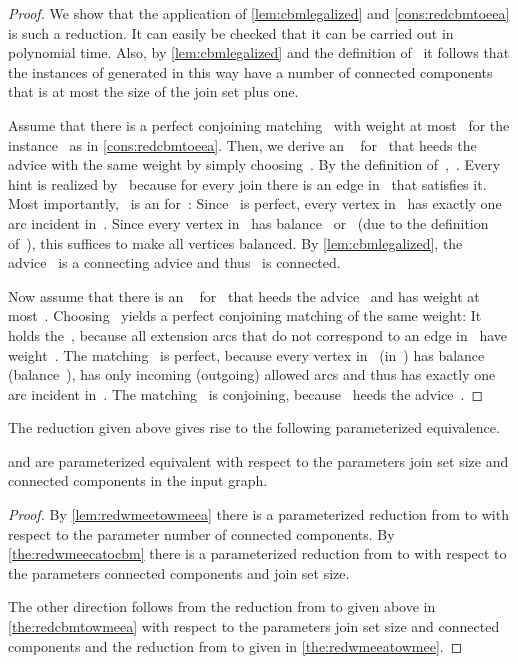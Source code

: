 \begin{proof}
  We show that the application of \autoref{lem:cbmlegalized} and \autoref{cons:redcbmtoeea} is such a reduction. It can easily be checked that it can be carried out in polynomial time. Also, by \autoref{lem:cbmlegalized} and the definition of~ it follows that the instances of \pWMEEAs{} generated in this way have a number of connected components that is at most the size of the join set plus one.

  Assume that there is a perfect conjoining matching~ with weight at most~ for the instance~ as in \autoref{cons:redcbmtoeea}. Then, we derive an \EE{}~ for~ that heeds the advice with the same weight by simply choosing~. By the definition of~,~. Every hint is realized by~ because for every join there is an edge in~ that satisfies it. Most importantly,~ is an \EE{} for~: Since~ is perfect, every vertex in~ has exactly one arc incident in~. Since every vertex in~ has balance~ or~ (due to the definition of~), this suffices to make all vertices balanced. By \autoref{lem:cbmlegalized}, the advice~ is a connecting advice and thus~ is connected.

  Now assume that there is an \EE{}~ for~ that heeds the advice~ and has weight at most~. Choosing~ yields a perfect conjoining matching of the same weight: It holds the~, because all extension arcs that do not correspond to an edge in~ have weight~. The matching~ is perfect, because every vertex in~ (in~) has balance~ (balance~), has only incoming (outgoing) allowed arcs and thus has exactly one arc incident in~. The matching~ is conjoining, because~ heeds the advice~.
\end{proof}
The reduction given above gives rise to the following parameterized equivalence.
\begin{theorem}\label{the:cbmwmeeequiv}
  \pCBM{} and \pWMEE{} are parameterized equivalent with respect to the parameters join set size and connected components in the input graph. 
\end{theorem}
\begin{proof}
  By \autoref{lem:redwmeetowmeea} there is a parameterized reduction from \pWMEEs{} to \pWMEECAs{} with respect to the parameter number of connected components. By \autoref{the:redwmeecatocbm} there is a parameterized reduction from \pWMEECAs{} to \pCBMs{} with respect to the parameters connected components and join set size.

The other direction follows from the reduction from \pCBMs{} to \pWMEEAs{} given above in \autoref{the:redcbmtowmeea} with respect to the parameters join set size and connected components and the reduction from \pWMEEAs{} to \pWMEEs{} given in \autoref{the:redwmeeatowmee}.
\end{proof}
